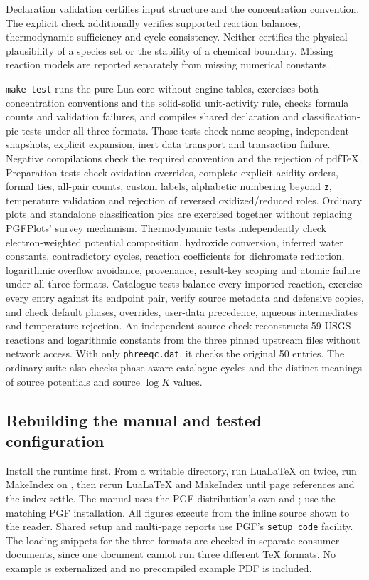 \documentclass[a4paper,11pt]{ltxdoc}
\begin{document}
Declaration validation certifies input structure and the concentration
convention. The explicit check additionally verifies supported reaction balances,
thermodynamic sufficiency and cycle consistency. Neither certifies the physical
plausibility of a species set or the stability of a chemical boundary. Missing
reaction models are reported separately from missing numerical constants.

\texttt{make test} runs the pure Lua core without engine tables, exercises both
concentration conventions and the solid-solid unit-activity rule, checks formula
counts and validation failures, and
compiles shared declaration and classification-pic tests under all three formats. Those tests check
name scoping, independent snapshots, explicit expansion, inert data transport
and transaction failure. Negative compilations check the required convention and
the rejection of pdfTeX. Preparation tests check oxidation overrides, complete
explicit acidity orders, formal ties, all-pair counts, custom labels, alphabetic
numbering beyond \texttt{z}, temperature validation and rejection of reversed
oxidized/reduced roles. Ordinary plots and standalone classification pics are
exercised together without replacing PGFPlots' survey mechanism. Thermodynamic
tests independently check electron-weighted potential composition, hydroxide
conversion, inferred water constants, contradictory cycles, reaction coefficients
for dichromate reduction, logarithmic overflow avoidance, provenance, result-key
scoping and atomic failure under all three formats. Catalogue tests balance
every imported reaction, exercise every entry against its endpoint pair, verify
source metadata and defensive copies, and check default phases, overrides,
user-data precedence, aqueous intermediates and temperature rejection.
An independent source check reconstructs
59 USGS reactions and logarithmic constants from the three pinned upstream files
without network access. With only \texttt{phreeqc.dat}, it checks the original
50 entries. The ordinary suite also checks phase-aware catalogue cycles and
the distinct meanings of source potentials and source $\log K$ values.

\subsection{Rebuilding the manual and tested configuration}
Install the runtime first. From a writable directory, run LuaLaTeX on
 twice, run MakeIndex on
, then rerun LuaLaTeX and MakeIndex until page
references and the index settle. The manual uses the PGF distribution's own
 and ; use the matching PGF
installation. All figures execute from the inline source shown to the reader.
Shared setup and multi-page reports use PGF's \texttt{setup code} facility.
The loading snippets for the three formats are checked in separate consumer
documents, since one document cannot run three different TeX formats.
No example is externalized and no precompiled example PDF is included.
\end{document}
